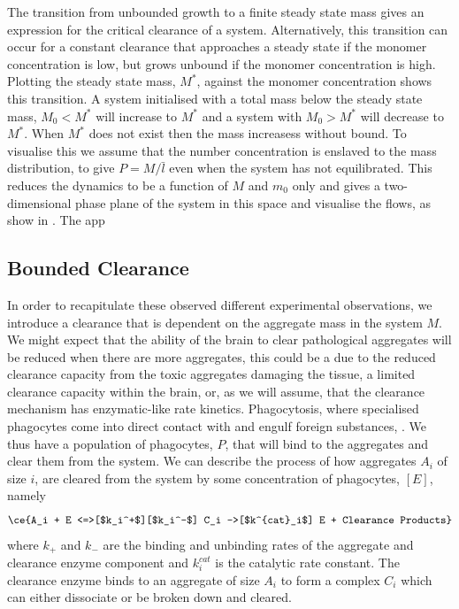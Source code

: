 The transition from unbounded growth to a finite steady state mass gives an expression for the critical clearance of a system. Alternatively, this transition can occur for a constant clearance that approaches a steady state if the monomer concentration is low, but grows unbound if the monomer concentration is high. Plotting the steady state mass, $M^*$, against the monomer concentration shows this transition. A system initialised with a total mass below the steady state mass, $M_0 < M^*$ will increase to $M^*$ and a system with $M_0 > M^*$ will decrease to $M^*$. When $M^*$ does not exist then the mass increasess without bound. To visualise this we assume that the number concentration is enslaved to the mass distribution, to give $P=M/\bar{l}$ even when the system has not equilibrated. This reduces the dynamics to be a function of $M$ and $m_0$ only and gives a two-dimensional phase plane of the system in this space and visualise the flows, as show in . The app

\subsection{Bounded Clearance}

In order to recapitulate these observed different experimental observations, we introduce a clearance that is dependent on the aggregate mass in the system $M$. We might expect that the ability of the brain to clear pathological aggregates will be reduced when there are more aggregates, this could be a due to the reduced clearance capacity from the toxic aggregates damaging the tissue, a limited clearance capacity within the brain, or, as we will assume, that the clearance mechanism has enzymatic-like rate kinetics.
Phagocytosis, where specialised phagocytes come into direct contact with and engulf foreign substances, . We thus have a population of phagocytes, $P$, that will bind to the aggregates and clear them from the system. We can describe the process of how aggregates $A_i$ of size $i$, are cleared from the system by some concentration of phagocytes, $[E]$, namely
\begin{equation}
        \ce{A_i + E <=>[$k_i^+$][$k_i^-$] C_i ->[$k^{cat}_i$] E + Clearance Products} \label{eq:MM}
\end{equation}
where $k_+$ and $k_-$ are the binding and unbinding rates of the aggregate and clearance enzyme component and $k^{cat}_i$ is the catalytic rate constant. The clearance enzyme binds to an aggregate of size $A_i$ to form a complex $C_i$ which can either dissociate or be broken down and cleared. 

